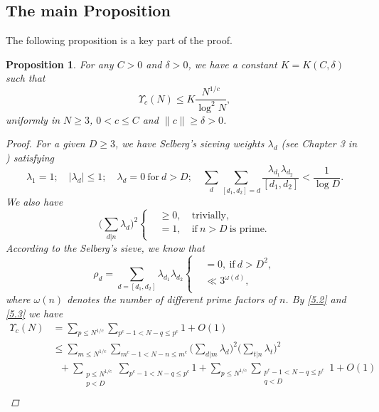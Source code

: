 \documentclass[12pt, reqno, twoside, letterpaper]{amsart}
\numberwithin{equation}{section}
\theoremstyle{customthm}
\newtheorem{proposition}[X]{Proposition}
\theoremstyle{customrem}
\begin{document}
\subsection{The main Proposition}
The following proposition is a key part of the proof.  
\begin{proposition}
\label{prop:main}
For any $C>0$ and $\delta>0$, we have a constant $K=K(C,\delta)$ such that
$$
\Upsilon_c(N)\leqslant K\frac{N^{1/c}}{\log ^2 N},
$$ 
uniformly in $N\geqslant 3$, $0<c\leqslant C$ and $\| c \|\geqslant \delta>0$.
\begin{proof}
For a given $D\geqslant 3$, we have Selberg's sieving weights $\lambda_d$ (see Chapter 3 in \cite{HR}) satisfying
\begin{equation}
	\label{5.1}
\lambda_1=1;\quad |\lambda_d|\leqslant 1;\quad \lambda_d=0\ \text{for}\ d>D;\quad \sum_{d}\sum_{[d_1,d_2]=d}\frac{\lambda_{d_1}\lambda_{d_2}}{[d_1,d_2]}<\frac{1}{\log D}.
\end{equation}
We also have
\begin{equation}
		\label{5.2}
	\bigg( \sum_{d|n}\lambda_d \bigg)^2
	\left\{
	\begin{matrix}
		&\geqslant 0,\ &\text{trivially}, \\
		&=1,\ &\text{if}\ n>D\ \text{is prime}. \\
	\end{matrix}
	\right.
\end{equation}
According to the Selberg's sieve, we know that
\begin{equation}
		\label{5.3}
	\rho_d=\sum_{d=[d_1,d_2]}\lambda_{d_1}\lambda_{d_2}
	\left\{
	\begin{matrix}
		&= 0,\ \text{if}\ d>D^2, \\
		&\ll  3^{\omega(d)}, \\
	\end{matrix}
	\right.
\end{equation}
where $\omega(n)$ denotes the number of different prime factors of $n$. By \eqref{5.2} and \eqref{5.3} we have
\begin{align}
	\label{5.4}
\nonumber \Upsilon_c(N)&=\sum_{p\leqslant N^{1/c}}\sum_{p^c-1<N-q\leqslant p^c}1+O(1)\\
\nonumber&\leqslant \sum_{m\leqslant N^{1/c}}\sum_{m^c-1<N-n\leqslant m^c}\bigg( \sum_{d|m}\lambda_d \bigg)^2\bigg( \sum_{t|n}\lambda_t \bigg)^2\\
\nonumber&\ \ \ +\sum_{\substack{p\leqslant N^{1/c} \\ p<D}}\sum_{p^c-1<N-q\leqslant p^c}1+\sum_{p\leqslant N^{1/c}}\sum_{\substack{p^c-1<N-q\leqslant p^c \\ q<D}}1+O(1)\\

\end{align}
\end{proof}
\end{proposition}
\end{document}
